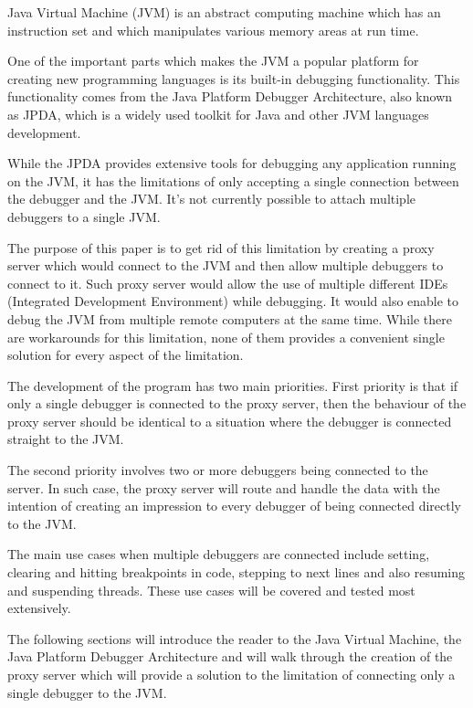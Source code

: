 \documentclass[..thesis.tex]{subfiles}
\begin{document}
Java Virtual Machine (JVM) is an abstract computing machine which has an instruction set and which manipulates various memory areas at run time.\cite{oracle_jvm_spec}

One of the important parts which makes the JVM a popular platform for creating new programming languages is its built-in debugging functionality. 
This functionality comes from the Java Platform Debugger Architecture, also known as JPDA, which is a widely used toolkit for Java and other JVM languages development.

While the JPDA provides extensive tools for debugging any application running on the JVM, it has the limitations of only accepting a single connection between the debugger and the JVM. 
It's not currently possible to attach multiple debuggers to a single JVM.

The purpose of this paper is to get rid of this limitation by creating a proxy server which would connect to the JVM and then allow multiple debuggers to connect to it. 
Such proxy server would allow the use of multiple different IDEs (Integrated Development Environment) while debugging. 
It would also enable to debug the JVM from multiple remote computers at the same time. 
While there are workarounds for this limitation, none of them provides a convenient single solution for every aspect of the limitation. 

The development of the program has two main priorities. 
First priority is that if only a single debugger is connected to the proxy server, then the behaviour of the proxy server should be identical to a situation where the debugger is connected straight to the JVM.

The second priority involves two or more debuggers being connected to the server. 
In such case, the proxy server will route and handle the data with the intention of creating an impression to every debugger of being connected directly to the JVM.

The main use cases when multiple debuggers are connected include setting, clearing and hitting breakpoints in code, stepping to next lines and also resuming and suspending threads.
These use cases will be covered and tested most extensively.

The following sections will introduce the reader to the Java Virtual Machine, the Java Platform Debugger Architecture and will walk through the creation of the proxy server which will provide a solution to the limitation of connecting only a single debugger to the JVM.
\end{document}
